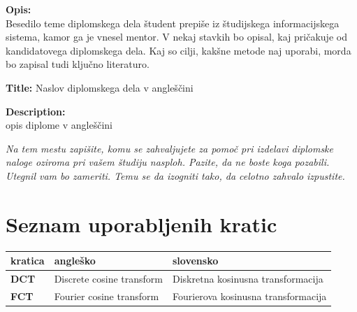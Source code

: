 \documentclass[a4paper,12pt,openright]{book}
\newcommand{\clearemptydoublepage}{\newpage{\pagestyle{empty}\cleardoublepage}}
\begin{document}
\bigskip
\noindent\textbf{Opis:}\\
Besedilo teme diplomskega dela študent prepiše iz študijskega informacijskega sistema, kamor ga je vnesel mentor. 
V nekaj stavkih bo opisal, kaj pričakuje od kandidatovega diplomskega dela. 
Kaj so cilji, kakšne metode naj uporabi, morda bo zapisal tudi ključno literaturo.

\bigskip
\noindent\textbf{Title:} Naslov diplomskega dela v angleščini

\bigskip
\noindent\textbf{Description:}\\
opis diplome v angleščini

\vfill



\vspace{2cm}

\clearemptydoublepage

\thispagestyle{empty}\mbox{}\vfill\null\it%
\noindent
Na tem mestu zapišite, komu se zahvaljujete za pomoč pri izdelavi diplomske naloge oziroma pri vašem študiju nasploh. Pazite, da ne boste koga pozabili. Utegnil vam bo zameriti. Temu se da izogniti tako, da celotno zahvalo izpustite.
\rm\normalfont


\clearemptydoublepage

\pagestyle{empty}
\def\thepage{}%
\tableofcontents{}


\clearemptydoublepage


\chapter*{Seznam uporabljenih kratic}

\noindent\begin{tabular}{p{}|p{}|p{}}    %
  {\bf kratica} & {\bf angleško}                              & {\bf slovensko} \\ \hline
  {\bf DCT}      & Discrete cosine transform               & Diskretna kosinusna transformacija \\
  {\bf FCT}      & Fourier cosine transform               & Fourierova kosinusna transformacija \\

\end{tabular}
\end{document}
